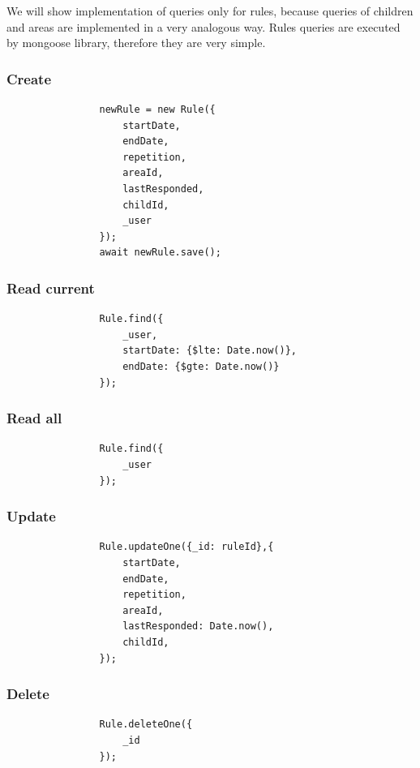 \documentclass{sprawozdanie-agh}
\begin{document}
		We will show implementation of queries only for rules, because queries of children and areas are implemented in a very analogous way. Rules queries are executed by mongoose library, therefore they are very simple.

		\subsubsection{Create}
			\begin{lstlisting}
				newRule = new Rule({
					startDate,
					endDate,
					repetition,
					areaId,
					lastResponded,
					childId,
					_user
				});
				await newRule.save();
			\end{lstlisting}

		\subsubsection{Read current}
			\begin{lstlisting}
				Rule.find({
					_user,
					startDate: {$lte: Date.now()},
					endDate: {$gte: Date.now()}
				});
			\end{lstlisting}

		\subsubsection{Read all}
			\begin{lstlisting}
				Rule.find({
					_user
				});
			\end{lstlisting}
		
		\subsubsection{Update}
			\begin{lstlisting}
				Rule.updateOne({_id: ruleId},{
					startDate,
					endDate,
					repetition,
					areaId,
					lastResponded: Date.now(),
					childId,
				});
			\end{lstlisting}
		
		\subsubsection{Delete}
			\begin{lstlisting}
				Rule.deleteOne({
					_id
				});
			\end{lstlisting}
\end{document}
